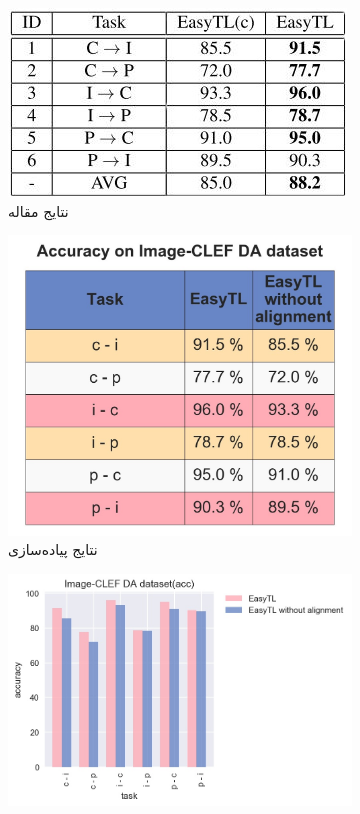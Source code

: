 \begin{figure}[H]
	\centering
	\begin{subfigure}[b]{0.2\textwidth}
		\centering
		\includegraphics[width=\linewidth]{images/2_4.jpg}
		\caption{نتایج مقاله}
	\end{subfigure}%
	\begin{subfigure}[b]{0.2\textwidth}
		\centering
		\includegraphics[width=\linewidth]{images/2_1.jpg}
		\caption{نتایج پیاده‌سازی}
	\end{subfigure}%
	\begin{subfigure}[b]{0.3\textwidth}
		\centering
		\includegraphics[width=\linewidth]{images/2_2.jpg}

\end{subfigure}
\end{figure}
